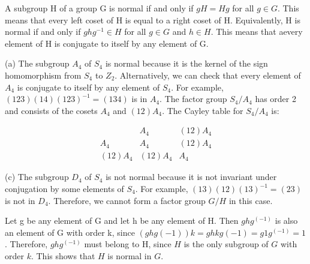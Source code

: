 \documentclass[a4paper, justified]{tufte-handout}
\begin{document}
\begin{problem}[TJ 10-1(a,c)]
\end{problem}

\begin{solution}
	A subgroup H of a group G is normal if and only if $gH = Hg$ for all $g \in G$. This means that every left coset of H is equal to a right coset of H. Equivalently, H is normal if and only if $ghg^{-1} \in H$ for all $g \in G$ and $h \in H$. This means that aevery element of H is conjugate to itself by any element of G.

	(a) The subgroup $A_4$ of $S_4$ is normal because it is the kernel of the sign homomorphism from $S_4$ to $Z_2$. Alternatively, we can check that every element of $A_4$ is conjugate to itself by any element of $S_4$. For example, $(1 2 3)(1 4)(1 2 3)^{-1} = (1 3 4)$ is in $A_4$. The factor group $S_4/A_4$ has order 2 and consists of the cosets $A_4$ and $(1 2)A_4$. The Cayley table for $S_4/A_4$ is:

	\[ \begin{array}{c|cc} & A_4 & (1 2)A_4 \\ \hline A_4 & A_4 & (1 2)A_4 \\ (1 2)A_4 & (1 2)A_4 & A_4 \end{array} \]

	(c) The subgroup $D_4$ of $S_4$ is not normal because it is not invariant under conjugation by some elements of $S_4$. For example, $(1 3)(1 2)(1 3)^{-1} = (2 3)$ is not in $D_4$. Therefore, we cannot form a factor group $G/H$ in this case.
\end{solution}

\begin{problem}[TJ 10-11]
\end{problem}

\begin{solution}
	Let g be any element of G and let h be any element of H. Then $ghg^(-1)$ is also an element of G with order k, since $(ghg(-1))k = ghkg(-1) = g1g^(-1) = 1$. Therefore, $ghg^(-1)$ must belong to H, since $H$ is the only subgroup of $G$ with order $k$. This shows that $H$ is normal in $G$.
\end{solution}


\begin{problem}[TJ 10-12]
\end{problem}
\end{document}
